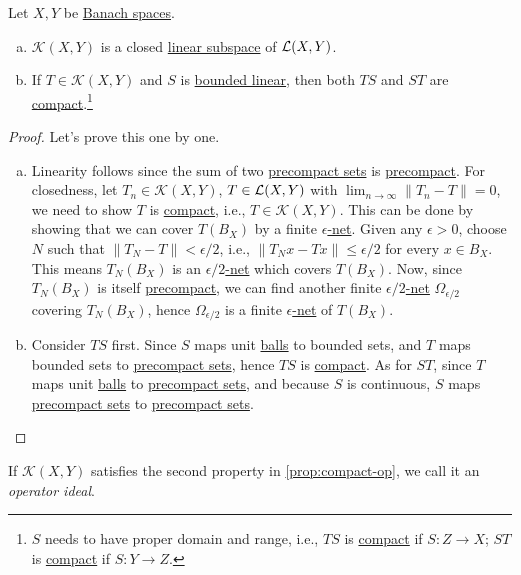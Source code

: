 \begin{proposition}\label{prop:compact-op}
	Let \(X, Y\) be \hyperref[def:Banach-space]{Banach spaces}.
	\begin{enumerate}[(a)]
		\item \(\mathcal{K}(X, Y)\) is a closed \hyperref[def:linear-vector-space]{linear subspace} of \(\mathcal{\MakeUppercase{l}} (X, Y)\).
		\item If \(T\in \mathcal{K}(X, Y)\) and \(S\) is \hyperref[def:bounded-linear-op]{bounded linear}, then both \(TS\) and \(ST\) are \hyperref[def:compact-op]{compact}.\footnote{\(S\) needs to have proper domain and range, i.e., \(TS\) is \hyperref[def:compact-op]{compact} if \(S\colon Z\to X\); \(ST\) is \hyperref[def:compact-op]{compact} if \(S\colon Y\to Z\).}
	\end{enumerate}
\end{proposition}
\begin{proof}
	Let's prove this one by one.
	\begin{enumerate}[(a)]
		\item Linearity follows since the sum of two \hyperref[def:precompact]{precompact sets} is \hyperref[def:precompact]{precompact}. For closedness, let \(T_n\in \mathcal{K}(X, Y)\), \(T\in \mathcal{\MakeUppercase{l}} (X, Y)\) with \(\lim_{n \to \infty} \left\lVert T_n - T\right\rVert = 0\), we need to show \(T\) is \hyperref[def:compact-op]{compact}, i.e., \(T\in \mathcal{K}(X, Y)\). This can be done by showing that we can cover \(T(B_X)\) by a finite \hyperref[def:eps-net]{\(\epsilon \)-net}. Given any \(\epsilon >0\), choose \(N\) such that \(\left\lVert T_N - T\right\rVert < \epsilon / 2\), i.e., \(\lVert T_N x - Tx \rVert \leq \epsilon / 2\) for every \(x\in B_X\). This means \(T_N(B_X)\) is an \hyperref[def:eps-net]{\(\epsilon /2\)-net} which covers \(T(B_X)\). Now, since \(T_N (B_X)\) is itself \hyperref[def:precompact]{precompact}, we can find another finite \hyperref[def:eps-net]{\(\epsilon / 2\)-net} \(\Omega _{\epsilon /2}\) covering \(T_N(B_X)\), hence \(\Omega _{\epsilon / 2}\) is a finite \hyperref[def:eps-net]{\(\epsilon \)-net} of \(T(B_X)\).
		\item Consider \(TS\) first. Since \(S\) maps unit \hyperref[def:ball]{balls} to bounded sets, and \(T\) maps bounded sets to \hyperref[def:precompact]{precompact sets}, hence \(TS\) is \hyperref[def:compact-op]{compact}. As for \(ST\), since \(T\) maps unit \hyperref[def:ball]{balls} to \hyperref[def:precompact]{precompact sets}, and because \(S\) is continuous, \(S\) maps \hyperref[def:precompact]{precompact sets} to \hyperref[def:precompact]{precompact sets}.
	\end{enumerate}
\end{proof}

\begin{remark}
	If \(\mathcal{K}(X, Y)\) satisfies the second property in \autoref{prop:compact-op}, we call it an \emph{operator ideal}.
\end{remark}